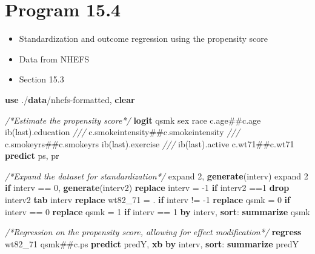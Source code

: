 \documentclass[
  10pt,
]{book}
\newenvironment{Shaded}{\begin{snugshade}}{\end{snugshade}}
\newcommand{\CommentTok}[1]{\textcolor[rgb]{0.56,0.35,0.01}{\textit{#1}}}
\newcommand{\FunctionTok}[1]{\textcolor[rgb]{0.00,0.00,0.00}{#1}}
\newcommand{\KeywordTok}[1]{\textcolor[rgb]{0.13,0.29,0.53}{\textbf{#1}}}
\newcommand{\NormalTok}[1]{#1}
\providecommand{\tightlist}{%
  \setlength{\itemsep}{0pt}\setlength{\parskip}{0pt}}
\begin{document}
\hypertarget{program-15.4}{%
\section{Program 15.4}\label{program-15.4}}

\begin{itemize}
\tightlist
\item
  Standardization and outcome regression using the propensity score
\item
  Data from NHEFS
\item
  Section 15.3
\end{itemize}

\begin{Shaded}
\begin{Highlighting}[]
\KeywordTok{use}\NormalTok{ ./}\KeywordTok{data}\NormalTok{/nhefs-formatted, }\KeywordTok{clear}

\CommentTok{/*Estimate the propensity score*/}
\KeywordTok{logit}\NormalTok{ qsmk sex race c.age##c.age ib(}\FunctionTok{last}\NormalTok{).education }\CommentTok{///}
\NormalTok{  c.smokeintensity##c.smokeintensity }\CommentTok{///}
\NormalTok{  c.smokeyrs##c.smokeyrs ib(}\FunctionTok{last}\NormalTok{).exercise }\CommentTok{///}
\NormalTok{  ib(}\FunctionTok{last}\NormalTok{).active c.wt71##c.wt71 }
\KeywordTok{predict}\NormalTok{ ps, pr}

\CommentTok{/*Expand the dataset for standardization*/}
\NormalTok{expand 2, }\KeywordTok{generate}\NormalTok{(interv)}
\NormalTok{expand 2 }\KeywordTok{if}\NormalTok{ interv == 0, }\KeywordTok{generate}\NormalTok{(interv2)}
\KeywordTok{replace}\NormalTok{ interv = -1 }\KeywordTok{if}\NormalTok{ interv2 ==1}
\KeywordTok{drop}\NormalTok{ interv2 }
\KeywordTok{tab}\NormalTok{ interv}
\KeywordTok{replace}\NormalTok{ wt82_71 = . }\KeywordTok{if}\NormalTok{ interv != -1}
\KeywordTok{replace}\NormalTok{ qsmk = 0 }\KeywordTok{if}\NormalTok{ interv == 0}
\KeywordTok{replace}\NormalTok{ qsmk = 1 }\KeywordTok{if}\NormalTok{ interv == 1}
\KeywordTok{by}\NormalTok{ interv, }\KeywordTok{sort}\NormalTok{: }\KeywordTok{summarize}\NormalTok{ qsmk}

\CommentTok{/*Regression on the propensity score, allowing for effect modification*/}
\KeywordTok{regress}\NormalTok{ wt82_71 qsmk##c.ps}
\KeywordTok{predict}\NormalTok{ predY, }\KeywordTok{xb}
\KeywordTok{by}\NormalTok{ interv, }\KeywordTok{sort}\NormalTok{: }\KeywordTok{summarize}\NormalTok{ predY}


\end{Highlighting}
\end{Shaded}
\end{document}
